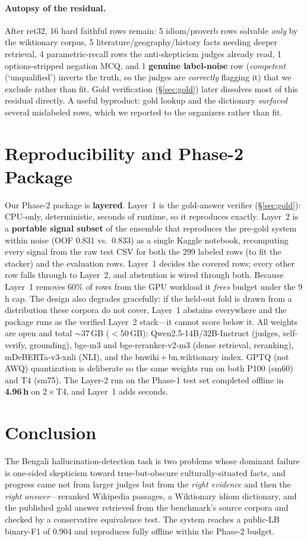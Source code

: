 \documentclass[11pt]{article}
\newcommand{\bn}[2]{\emph{#1} (`#2')}   %
\begin{document}
\paragraph{Autopsy of the residual.} After ret32, 16 hard faithful rows remain:
5 idiom/proverb rows solvable \emph{only} by the wiktionary corpus, 5
literature/geography/history facts needing deeper retrieval, 4 parametric-recall
rows the anti-skepticism judges already read, 1 options-stripped negation MCQ,
and 1 \textbf{genuine label-noise} row (\bn{competent}{unqualified} inverts the
truth, so the judges are \emph{correctly} flagging it) that we exclude rather
than fit. Gold verification (\S\ref{sec:gold}) later dissolves most of this
residual directly. A useful byproduct: gold lookup and the dictionary
\emph{surfaced} several mislabeled rows, which we reported to the organizers
rather than fit.

\section{Reproducibility and Phase-2 Package}
Our Phase-2 package is \textbf{layered}. Layer~1 is the gold-answer verifier
(\S\ref{sec:gold}): CPU-only, deterministic, seconds of runtime, so it
reproduces exactly. Layer~2 is a \textbf{portable signal subset} of the ensemble
that reproduces the pre-gold system within noise (OOF $0.831$ vs.\ $0.833$) as a
single Kaggle notebook, recomputing every signal from the raw test CSV for both
the 299 labeled rows (to fit the stacker) and the evaluation rows. Layer~1
decides the covered rows; every other row falls through to Layer~2, and
abstention is wired through both. Because Layer~1 removes $60\%$ of rows from the
GPU workload it \emph{frees} budget under the 9\,h cap. The design also degrades
gracefully: if the held-out fold is drawn from a distribution these corpora do
not cover, Layer~1 abstains everywhere and the package runs as the verified
Layer~2 stack---it cannot score below it. All weights are open and total
$\sim$37\,GB ($<$50\,GB): Qwen2.5-14B/32B-Instruct (judges, self-verify,
grounding), bge-m3 and bge-reranker-v2-m3 (dense retrieval, reranking),
mDeBERTa-v3-xnli (NLI), and the bnwiki\,$+$\,bn.wiktionary index. GPTQ (not AWQ)
quantization is deliberate so the same weights run on both P100 (sm60) and
T4 (sm75). The Layer-2 run on the Phase-1 test set completed offline in
\textbf{4.96\,h} on $2\times$T4, and Layer~1 adds seconds.

\section{Conclusion}
The Bengali hallucination-detection task is two problems whose dominant failure
is one-sided skepticism toward true-but-obscure culturally-situated facts, and
progress came not from larger judges but from the \emph{right evidence} and then
the \emph{right answer}---reranked Wikipedia passages, a Wiktionary idiom
dictionary, and the published gold answer retrieved from the benchmark's source
corpora and checked by a conservative equivalence test. The system reaches a
public-LB binary-F1 of 0.904 and reproduces fully offline within the Phase-2
budget.
\end{document}
